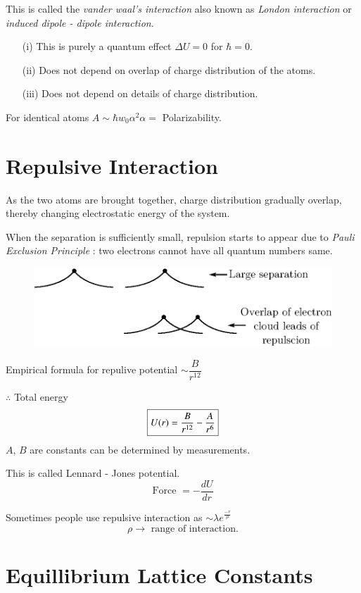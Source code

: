 This is called the {\em vander waal's interaction} also known as {\em London interaction} or {\em induced dipole - dipole interaction}.
\begin{itemize}
\item[(i)] This is purely a quantum effect $\Delta U=0$ for $\hbar=0$.

\item[(ii)] Does not depend on overlap of charge distribution of the atoms.

\item[(iii)] Does not depend on details of charge distribution.
\end{itemize}
For identical atoms $A\sim \hbar w_{0}\alpha^{2}$\quad $\alpha=$ Polarizability.

\section*{Repulsive Interaction}

As the two atoms are brought together, charge distribution gradually overlap, thereby changing electrostatic energy of the system.

When the separation is sufficiently small, repulsion starts to appear due to {\em Pauli Exclusion Principle} : two electrons cannot have all quantum numbers same.
\begin{figure}[H]
\centering
\includegraphics{images/lecture15/fig2.eps}
\end{figure}

Empirical formula for repulive potential $\sim \dfrac{B}{r^{12}}$

$\therefore$ Total energy
$$
\fbox{$U(r)=\dfrac{B}{r^{12}}-\dfrac{A}{r^{6}}$}
$$
$A$, $B$ are constants can be determined by measurements.

This is called Lennard - Jones potential.
$$
\text{Force } = -\dfrac{dU}{dr}
$$

Sometimes people use repulsive interaction as $\sim \lambda e^{\frac{-r}{\rho}}$
$$
\rho \to \text{ range of interaction.}
$$

\section*{Equillibrium Lattice Constants}

